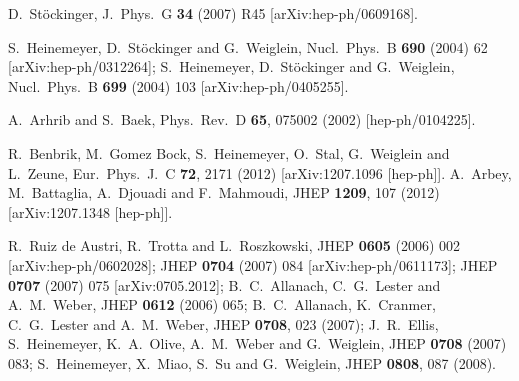 \begin{thebibliography}{99}
 D.~St\"ockinger, 
J.\ Phys.\ G {\bf 34} (2007) R45
 [arXiv:hep-ph/0609168].  

  S.~Heinemeyer, D.~St\"ockinger and G.~Weiglein,
  Nucl.\ Phys.\ B {\bf 690} (2004) 62
  [arXiv:hep-ph/0312264];
  S.~Heinemeyer, D.~St\"ockinger and G.~Weiglein,
  Nucl.\ Phys.\ B {\bf 699} (2004) 103
  [arXiv:hep-ph/0405255].

  A.~Arhrib and S.~Baek,
  Phys.\ Rev.\ D {\bf 65}, 075002 (2002)
  [hep-ph/0104225].




  R.~Benbrik, M.~Gomez Bock, S.~Heinemeyer, O.~Stal, G.~Weiglein and L.~Zeune,
  Eur.\ Phys.\ J.\ C {\bf 72}, 2171 (2012)
  [arXiv:1207.1096 [hep-ph]].
  A.~Arbey, M.~Battaglia, A.~Djouadi and F.~Mahmoudi,
  JHEP {\bf 1209}, 107 (2012)
  [arXiv:1207.1348 [hep-ph]].

R.~Ruiz de Austri, R.~Trotta and L.~Roszkowski,
JHEP \textbf{0605} (2006) 002 [arXiv:hep-ph/0602028];
JHEP \textbf{0704} (2007) 084 [arXiv:hep-ph/0611173];
%
JHEP \textbf{0707} (2007) 075 [arXiv:0705.2012];
B.~C.~Allanach, C.~G.~Lester and A.~M.~Weber,
JHEP \textbf{0612} (2006) 065;
B.~C.~Allanach, K.~Cranmer, C.~G.~Lester and A.~M.~Weber,
 JHEP {\bf 0708}, 023 (2007);
J.~R.~Ellis, S.~Heinemeyer, K.~A.~Olive, A.~M.~Weber and
G.~Weiglein,
  JHEP {\bf 0708} (2007) 083; %
  S.~Heinemeyer, X.~Miao, S.~Su and G.~Weiglein,
 JHEP {\bf 0808}, 087 (2008).



\end{thebibliography}
